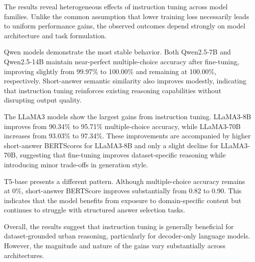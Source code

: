 \documentclass[a4paper,fleqn]{cas-sc}
\begin{document}


The results reveal heterogeneous effects of instruction tuning across model families. Unlike the common assumption that lower training loss necessarily leads to uniform performance gains, the observed outcomes depend strongly on model architecture and task formulation.

Qwen models demonstrate the most stable behavior. Both Qwen2.5-7B and Qwen2.5-14B maintain near-perfect multiple-choice accuracy after fine-tuning, improving slightly from 99.97\% to 100.00\% and remaining at 100.00\%, respectively. Short-answer semantic similarity also improves modestly, indicating that instruction tuning reinforces existing reasoning capabilities without disrupting output quality.

The LLaMA3 models show the largest gains from instruction tuning. LLaMA3-8B improves from 90.34\% to 95.71\% multiple-choice accuracy, while LLaMA3-70B increases from 93.03\% to 97.34\%. These improvements are accompanied by higher short-answer BERTScores for LLaMA3-8B and only a slight decline for LLaMA3-70B, suggesting that fine-tuning improves dataset-specific reasoning while introducing minor trade-offs in generation style.

T5-base presents a different pattern. Although multiple-choice accuracy remains at 0\%, short-answer BERTScore improves substantially from 0.82 to 0.90. This indicates that the model benefits from exposure to domain-specific content but continues to struggle with structured answer selection tasks.

Overall, the results suggest that instruction tuning is generally beneficial for dataset-grounded urban reasoning, particularly for decoder-only language models. However, the magnitude and nature of the gains vary substantially across architectures.
\end{document}
